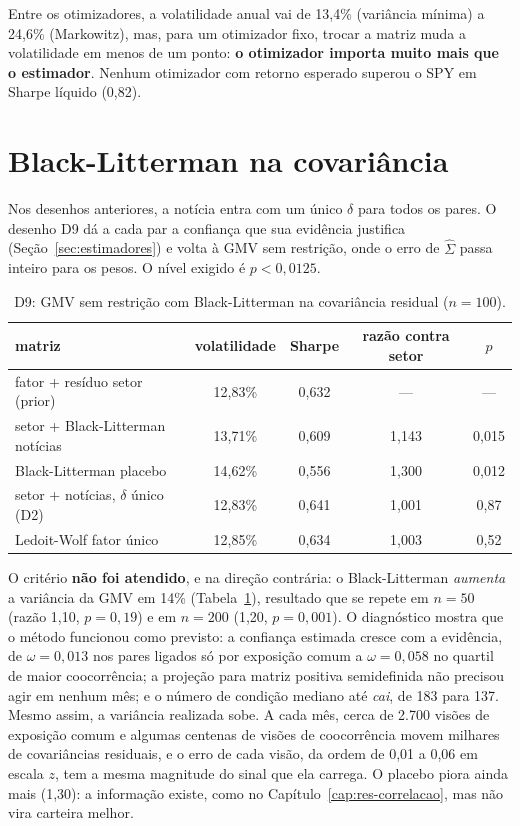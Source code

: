 Entre os otimizadores, a volatilidade anual vai de 13,4\% (variância mínima) a 24,6\% (Markowitz), mas,
para um otimizador fixo, trocar a matriz muda a volatilidade em menos de um ponto: \textbf{o otimizador
importa muito mais que o estimador}. Nenhum otimizador com retorno esperado superou o SPY em Sharpe líquido
(0,82).

\section{Black-Litterman na covariância}
\label{sec:d9}

Nos desenhos anteriores, a notícia entra com um único $\delta$ para todos os pares. O desenho D9 dá a cada
par a confiança que sua evidência justifica (Seção~\ref{sec:estimadores}) e volta à GMV sem restrição, onde o
erro de $\hat\Sigma$ passa inteiro para os pesos. O nível exigido é $p<0{,}0125$.

\begin{table}[htbp]
\centering
\small
\caption{D9: GMV sem restrição com Black-Litterman na covariância residual ($n=100$).}
\label{tab:d9}
\begin{tabular}{lcccc}
\toprule
matriz & volatilidade & Sharpe & razão contra setor & $p$ \\
\midrule
fator + resíduo setor (prior) & 12,83\% & 0,632 & --- & --- \\
setor + Black-Litterman notícias & 13,71\% & 0,609 & 1,143 & 0,015 \\
Black-Litterman placebo & 14,62\% & 0,556 & 1,300 & 0,012 \\
setor + notícias, $\delta$ único (D2) & 12,83\% & 0,641 & 1,001 & 0,87 \\
Ledoit-Wolf fator único & 12,85\% & 0,634 & 1,003 & 0,52 \\
\bottomrule
\end{tabular}
\end{table}

O critério \textbf{não foi atendido}, e na direção contrária: o Black-Litterman \emph{aumenta} a variância da
GMV em 14\% (Tabela~\ref{tab:d9}), resultado que se repete em $n=50$ (razão 1,10, $p=0{,}19$) e em $n=200$
(1,20, $p=0{,}001$). O diagnóstico mostra que o método funcionou como previsto: a confiança estimada cresce com a evidência,
de $\omega=0{,}013$ nos pares ligados só por exposição comum a $\omega=0{,}058$ no quartil de maior
coocorrência; a projeção para matriz positiva semidefinida não precisou agir em nenhum mês; e o número de
condição mediano até \emph{cai}, de 183 para 137. Mesmo assim, a variância realizada sobe. A cada mês, cerca
de 2.700 visões de exposição comum e algumas centenas de visões de coocorrência movem milhares de covariâncias
residuais, e o erro de cada visão, da ordem de 0,01 a 0,06 em escala $z$, tem a mesma magnitude do sinal
que ela carrega. O placebo piora ainda mais (1,30): a informação existe, como no Capítulo~\ref{cap:res-correlacao},
mas não vira carteira melhor.


